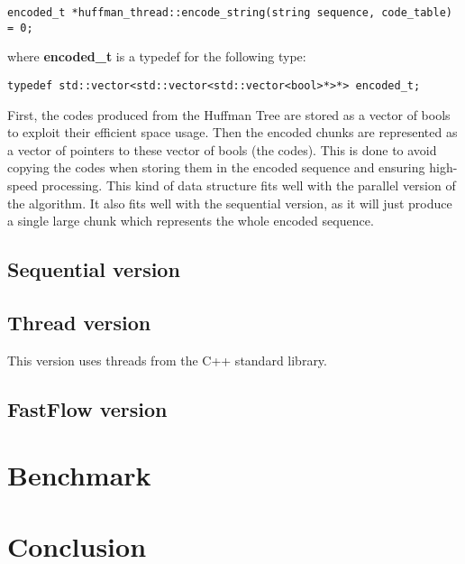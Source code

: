\documentclass{report}
\begin{document}
\begin{verbatim}
encoded_t *huffman_thread::encode_string(string sequence, code_table) = 0;
\end{verbatim}
where \textbf{encoded\_t} is a typedef for the following type:
\begin{verbatim}
typedef std::vector<std::vector<std::vector<bool>*>*> encoded_t;
\end{verbatim}

First, the codes produced from the Huffman Tree are stored as a vector of bools to exploit their
efficient space usage. Then the encoded chunks are represented as a vector of pointers to
these vector of bools (the codes). This is done to avoid copying the codes when storing them
in the encoded sequence and ensuring high-speed processing.
This kind of data structure fits well with the parallel version of the algorithm.
It also fits well with the sequential version, as it will just produce a single
large chunk which represents the whole encoded sequence.

\section{Sequential version}

\section{Thread version}
This version uses threads from the C++ standard library.

\section{FastFlow version}

\chapter{Benchmark}

\chapter{Conclusion}
\end{document}

